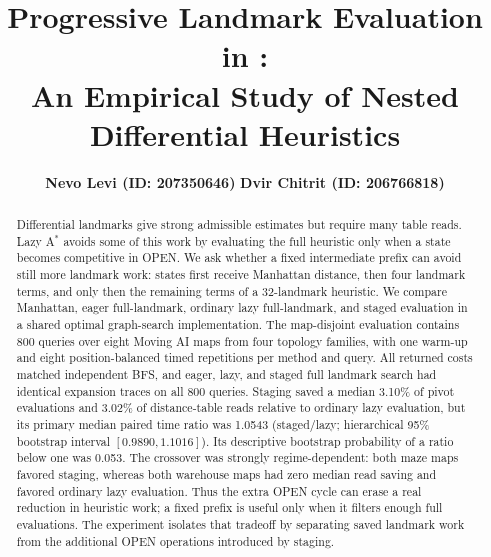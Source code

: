 \documentclass[letterpaper]{article}
\title{Progressive Landmark Evaluation in \Astar{}:\\
An Empirical Study of Nested Differential Heuristics}
\author{\textbf{Nevo Levi (ID: 207350646)} \qquad
        \textbf{Dvir Chitrit (ID: 206766818)}}
\newcommand{\Astar}{A$^\ast$}
\begin{document}
\maketitle

\begin{abstract}
Differential landmarks give strong admissible estimates but require many
table reads.  Lazy \Astar{} avoids some of this work by evaluating the full
heuristic only when a state becomes competitive in OPEN.  We ask whether a
fixed intermediate prefix can avoid still more landmark work: states first
receive Manhattan distance, then four landmark terms, and only then the
remaining terms of a 32-landmark heuristic.  We compare Manhattan, eager
full-landmark, ordinary lazy full-landmark, and staged evaluation in a shared
optimal graph-search implementation.  The map-disjoint evaluation contains
800 queries over eight Moving AI maps from four topology families, with one
warm-up and eight position-balanced timed repetitions per method and query.
All returned costs matched independent BFS, and eager, lazy, and staged full
landmark search had identical expansion traces on all 800 queries.  Staging
saved a median 3.10\% of pivot evaluations and 3.02\% of distance-table reads
relative to ordinary lazy evaluation, but its primary median paired time ratio
was 1.0543 (staged/lazy; hierarchical 95\% bootstrap interval
$[0.9890,1.1016]$).  Its descriptive bootstrap probability of a ratio below
one was 0.053.  The crossover was strongly regime-dependent: both maze maps
favored staging, whereas both warehouse maps had zero median read saving and
favored ordinary lazy evaluation.  Thus the extra OPEN cycle can erase a real
reduction in heuristic work; a fixed prefix is useful only when it filters
enough full evaluations.  The experiment isolates that tradeoff by separating
saved landmark work from the additional OPEN operations introduced by staging.
\end{abstract}













\enlargethispage{2\baselineskip}

\end{document}
